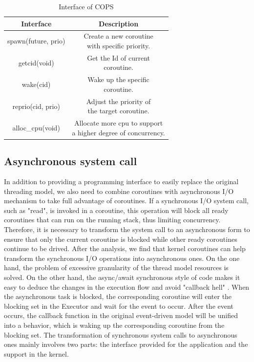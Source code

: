 \documentclass[sigconf,review,anonymous]{acmart}
\begin{document}
\begin{table}
  \caption{Interface of COPS}
  \label{tab:interface}
  \begin{tabular}{|c|c|}
    \hline
    \textbf{Interface} & \textbf{Description} \\                   
    \hline
    spawn(future, prio) &\makecell{Create a new coroutine \\ with specific priority.} \\
    \hline
    getcid(void) & \makecell{Get the Id of current \\ coroutine.} \\
    \hline
    wake(cid) & \makecell{Wake up the specific \\ coroutine.} \\
    \hline
    reprio(cid, prio) & \makecell{Adjust the priority of \\ the target coroutine.} \\
    \hline
    alloc\_cpu(void) & \makecell{Allocate more cpu to support \\ a higher degree of concurrency.}\\
    \hline

  \end{tabular}
\end{table}

\subsection{Asynchronous system call}

In addition to providing a programming interface to easily replace the original threading model, we also need to combine coroutines with asynchronous I/O mechanism to take full advantage of coroutines. If a synchronous I/O system call, such as "read", is invoked in a coroutine, this operation will block all ready coroutines that can run on the running stack, thus limiting concurrency. Therefore, it is necessary to transform the system call to an asynchronous form to ensure that only the current coroutine is blocked while other ready coroutines continue to be drived. After the analysis, we find that kernel coroutines can help transform the synchronous I/O operations into asynchronous ones. On the one hand, the problem of excessive granularity of the thread model resources is solved. On the other hand, the async/await synchronous style of code makes it easy to deduce the changes in the execution flow and avoid "callback hell" \cite{callbackhell}. When the asynchronous task is blocked, the corresponding coroutine will enter the blocking set in the Executor and wait for the event to occur. After the event occurs, the callback function in the original event-driven model will be unified into a behavior, which is waking up the corresponding coroutine from the blocking set. The transformation of synchronous system calls to asynchronous ones mainly involves two parts: the interface provided for the application and the support in the kernel.
\end{document}

